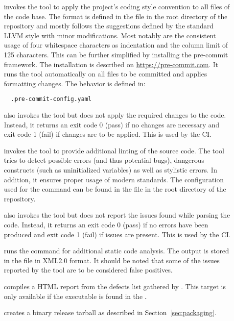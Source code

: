 \begin{description}
  \item[] invokes the  tool to apply the project's coding style convention to all files of the code base. The format is defined in the  file in the root directory of the repository and mostly follows the suggestions defined by the standard LLVM style with minor modifications. Most notably are the consistent usage of four whitespace characters as indentation and the column limit of 125 characters. This can be further simplified by installing the pre-commit framework. The installation is described on \url{https://pre-commit.com}. It runs the  tool automatically on all files to be committed and applies formatting changes. The behavior is defined in:

  \begin{verbatim}
  .pre-commit-config.yaml
  \end{verbatim}

  \item[] also invokes the  tool but does not apply the required changes to the code. Instead, it returns an exit code 0 (pass) if no changes are necessary and exit code 1 (fail) if changes are to be applied. This is used by the CI.
  \item[] invokes the  tool to provide additional linting of the source code. The tool tries to detect possible errors (and thus potential bugs), dangerous constructs (such as uninitialized variables) as well as stylistic errors. In addition, it ensures proper usage of modern \CPP standards. The configuration used for the  command can be found in the  file in the root directory of the repository.
  \item[] also invokes the  tool but does not report the issues found while parsing the code. Instead, it returns an exit code 0 (pass) if no errors have been produced and exit code 1 (fail) if issues are present. This is used by the CI.
  \item[] runs the  command for additional static code analysis. The output is stored in the file  in XML2.0 format. It should be noted that some of the issues reported by the tool are to be considered false positives.
  \item[] compiles a HTML report from the defects list gathered by . This target is only available if the  executable is found in the .
  \item[] creates a binary release tarball as described in Section~\ref{sec:packaging}.
\end{description}

